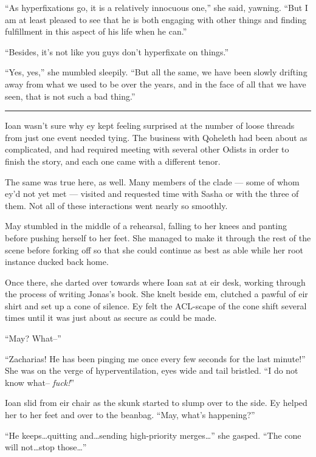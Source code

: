 ``As hyperfixations go, it is a relatively innocuous one,'' she said, yawning. ``But I am at least pleased to see that he is both engaging with other things and finding fulfillment in this aspect of his life when he can.''

``Besides, it's not like you guys don't hyperfixate on things.''

``Yes, yes,'' she mumbled sleepily. ``But all the same, we have been slowly drifting away from what we used to be over the years, and in the face of all that we have seen, that is not such a bad thing.''

\begin{center}\rule{0.5\linewidth}{0.5pt}\end{center}

Ioan wasn't sure why ey kept feeling surprised at the number of loose threads from just one event needed tying. The business with Qoheleth had been about as complicated, and had required meeting with several other Odists in order to finish the story, and each one came with a different tenor.

The same was true here, as well. Many members of the clade — some of whom ey'd not yet met — visited and requested time with Sasha or with the three of them. Not all of these interactions went nearly so smoothly.

May stumbled in the middle of a rehearsal, falling to her knees and panting before pushing herself to her feet. She managed to make it through the rest of the scene before forking off so that she could continue as best as able while her root instance ducked back home.

Once there, she darted over towards where Ioan sat at eir desk, working through the process of writing Jonas's book. She knelt beside em, clutched a pawful of eir shirt and set up a cone of silence. Ey felt the ACL-scape of the cone shift several times until it was just about as secure as could be made.

``May? What--''

``Zacharias! He has been pinging me once every few seconds for the last minute!'' She was on the verge of hyperventilation, eyes wide and tail bristled. ``I do not know what-- \emph{fuck!}''

Ioan slid from eir chair as the skunk started to slump over to the side. Ey helped her to her feet and over to the beanbag. ``May, what's happening?''

``He keeps\ldots quitting and\ldots sending high-priority merges\ldots{}'' she gasped. ``The cone will not\ldots stop those\ldots{}''

